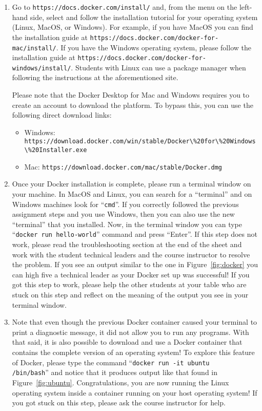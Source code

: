 \documentclass[11pt]{article}
\newcommand{\command}[1]{``\lstinline{#1}''}
\newcommand{\url}[1]{\lstinline{#1}}
\begin{document}
\begin{enumerate}
    \item Go to \url{https://docs.docker.com/install/} and, from the menu on
      the left-hand side, select and follow the installation tutorial for your
      operating system (Linux, MacOS, or Windows). For example, if you have
      MacOS you can find the installation guide at
      \url{https://docs.docker.com/docker-for-mac/install/}. If you have the
      Windows operating system, please follow the installation guide at
      \url{https://docs.docker.com/docker-for-windows/install/}. Students with
      Linux can use a package manager when following the instructions at the
      aforementioned site.

      Please note that the Docker Desktop for Mac and Windows requires you to
      create an account to download the platform. To bypass this, you can use
      the following direct download links:

    \begin{itemize}
        \item Windows: \\ \url{https://download.docker.com/win/stable/Docker\%20for\%20Windows\%20Installer.exe}
        \item Mac: \url{https://download.docker.com/mac/stable/Docker.dmg}
    \end{itemize}

  \item Once your Docker installation is complete, please run a terminal window
    on your machine. In MacOS and Linux, you can search for a ``terminal'' and
    on Windows machines look for \command{cmd}. If you correctly followed the
    previous assignment steps and you use Windows, then you can also use the new
    ``terminal'' that you installed. Now, in the terminal window you can type
    \command{docker run hello-world} command and press ``Enter''. If this step
    does not work, please read the troubleshooting section at the end of the
    sheet and work with the student technical leaders and the course instructor
    to resolve the problem. If you see an output similar to the one in
    Figure~\ref{fig:docker} you can high five a technical leader as your Docker
    set up was successful! If you got this step to work, please  help the other
    students at your table who are stuck on this step and reflect on the meaning
    of the output you see in your terminal window.

  \item Note that even though the previous Docker container caused your terminal
    to print a diagnostic message, it did not allow you to run any programs.
    With that said, it is also possible to download and use a Docker container
    that contains the complete version of an operating system! To explore this
    feature of Docker, please type the command \command{docker run -it ubuntu
    /bin/bash} and notice that it produces output like that found in
    Figure~\ref{fig:ubuntu}. Congratulations, you are now running the Linux
    operating system inside a container running on your host operating system!
    If you got stuck on this step, please ask the course instructor for help.


\end{enumerate}
\end{document}
